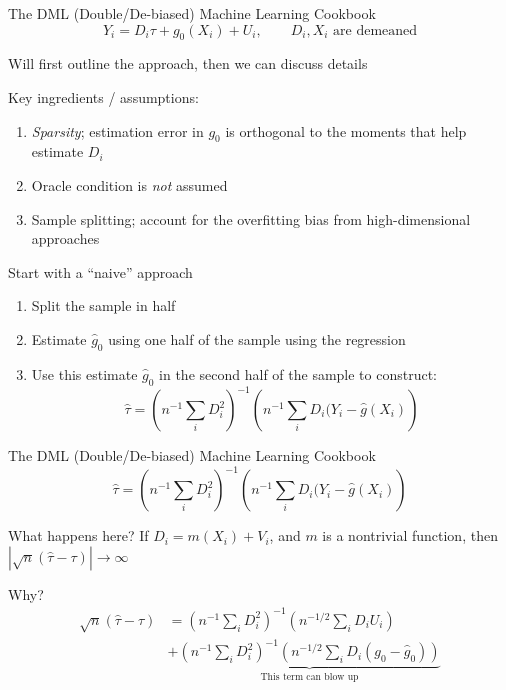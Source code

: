 \documentclass[notes,11pt, aspectratio=169]{beamer}
\newenvironment{wideitemize}{\itemize\addtolength{\itemsep}{10pt}}{\enditemize}
\begin{document}
\begin{frame}{The DML (Double/De-biased) Machine Learning Cookbook}
  $$Y_{i} = D_{i}\tau + g_{0}(X_{i}) + U_{i}, \qquad D_{i}, X_{i} \text{ are demeaned}$$  
  \begin{wideitemize}
  \item Will first outline the approach, then we can discuss details
  \item Key ingredients / assumptions:
    \begin{enumerate}
    \item \emph{Sparsity}; estimation error in $g_{0}$ is orthogonal
      to the moments that help estimate $D_{i}$
    \item Oracle condition is \emph{not} assumed
    \item Sample splitting; account for the overfitting bias from
      high-dimensional approaches
    \end{enumerate}
  \item Start with a ``naive'' approach
    \begin{enumerate}
    \item Split the sample in half
    \item Estimate $\hat{g}_{0}$ using one half of the sample using the regression
    \item Use this estimate $\hat{g}_{0}$ in the second half of the sample to construct:
      $$\hat{\tau} = \left(n^{-1}\sum_{i}D^{2}_{i}\right)^{-1}\left(n^{-1}\sum_{i}D_{i}(Y_{i} - \hat{g}(X_{i})\right)$$      
    \end{enumerate}
  \end{wideitemize}
\end{frame}

\begin{frame}{The DML (Double/De-biased) Machine Learning Cookbook}
  $$\hat{\tau} = \left(n^{-1}\sum_{i}D^{2}_{i}\right)^{-1}\left(n^{-1}\sum_{i}D_{i}(Y_{i} - \hat{g}(X_{i})\right)$$
  \begin{wideitemize}
  \item What happens here? If $D_{i} = m(X_{i}) + V_{i}$, and $m$ is a
    nontrivial function, then $|\sqrt{n}(\hat{\tau} - \tau)| \rightarrow \infty$
  \item Why?
    \begin{align*}
      \sqrt{n}(\hat{\tau} - \tau) &= \left(n^{-1}\sum_{i}D^{2}_{i}\right)^{-1}\left(n^{-1/2}\sum_{i}D_{i}U_{i}\right) \\
      &+ \underbrace{\left(n^{-1}\sum_{i}D^{2}_{i}\right)^{-1}\left(n^{-1/2}\sum_{i}D_{i}(g_{0} - \hat{g}_{0})\right)}_{\text{This term can blow up}}
      \end{align*}
  \end{wideitemize}
\end{frame}
\end{document}
